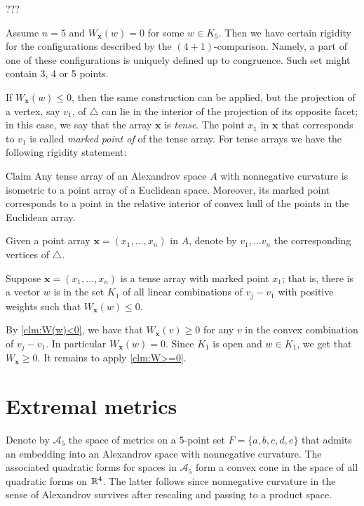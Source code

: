 \documentclass{article}
\begin{document}
???



Assume $n=5$ and $W_{\bm{x}}(w)=0$ for some $w\in K_5$.
Then we have certain rigidity for the configurations described by the $(4+1)$-comparison.
Namely, a part of one of these configurations is uniquely defined up to congruence.
Such set might contain 3, 4 or 5 points.


If $W_{\bm{x}}(w)\le0$, then the same construction can be applied, but the projection of a vertex, say $v_1$, of $\triangle$ can lie in the interior of the projection of its opposite facet;
in this case, we say that the array $\bm{x}$ is \emph{tense}.
The point $x_1$ in $\bm{x}$ that corresponds to $v_1$ is called \emph{marked point of} of the tense array.
For tense arrays we have the following rigidity statement:

\begin{thm}{Claim}\label{clm:W(w)==0}
Any tense array of an Alexandrov space $A$ with nonnegative curvature is isometric to a point array of a Euclidean space.
Moreover, its marked point corresponds to a point in the relative interior of convex hull of the points in the Euclidean array.
\end{thm}

Given a point array $\bm{x}=(x_1,\dots,x_n)$ in $A$, denote by $v_1,\dots v_n$ the corresponding vertices of $\triangle$.

Suppose $\bm{x}=(x_1,\dots,x_n)$ is a tense array with marked point $x_1$;
that is, there is a vector $w$ is in the set $K_1$ of all linear combinations of $v_j-v_1$ with positive weights such that $W_{\bm{x}}(w)\le 0$. 

By \ref{clm:W(w)<0}, we have that $W_{\bm{x}}(v)\ge 0$ for any $v$ in the convex combination of $v_j-v_1$.
In particular $W_{\bm{x}}(w)=0$.
Since $K_1$ is open and $w\in K_1$, we get that $W_{\bm{x}}\ge 0$.
It remains to apply \ref{clm:W>=0}.
\qeds

\section{Extremal metrics}\label{sec:ext}

Denote by $\mathcal{A}_5$ the space of metrics on a 5-point set $F=\{a,b,c,d,e\}$ that admits an embedding into an Alexandrov space with nonnegative curvature.
The associated quadratic forms for spaces in $\mathcal{A}_5$ form a convex cone in the space of all quadratic forms on $\mathbb{R}^4$.
The latter follows since nonnegative curvature in the sense of Alexandrov survives after rescaling and passing to a product space.
\end{document}
